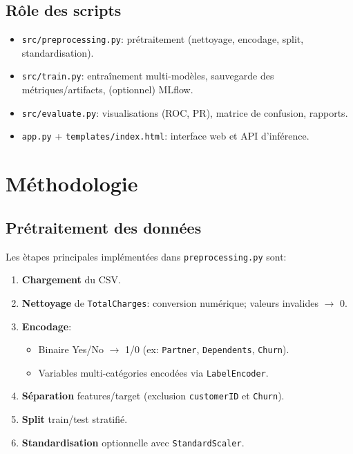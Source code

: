 \documentclass[11pt,a4paper]{article}
\begin{document}
\subsection{R\^ole des scripts}
\begin{itemize}
  \item \texttt{src/preprocessing.py}: pr\'etraitement (nettoyage, encodage, split, standardisation).
  \item \texttt{src/train.py}: entra\^inement multi-mod\`eles, sauvegarde des m\'etriques/artifacts, (optionnel) MLflow.
  \item \texttt{src/evaluate.py}: visualisations (ROC, PR), matrice de confusion, rapports.
  \item \texttt{app.py} + \texttt{templates/index.html}: interface web et API d'inf\'erence.
\end{itemize}

\section{M\'ethodologie}
\subsection{Pr\'etraitement des donn\'ees}
Les \`etapes principales impl\'ement\'ees dans \texttt{preprocessing.py} sont:
\begin{enumerate}
  \item \textbf{Chargement} du CSV.
  \item \textbf{Nettoyage} de \texttt{TotalCharges}: conversion num\'erique; valeurs invalides $\rightarrow$ 0.
  \item \textbf{Encodage}:
  \begin{itemize}
    \item Binaire Yes/No $\rightarrow$ 1/0 (ex: \texttt{Partner}, \texttt{Dependents}, \texttt{Churn}).
    \item Variables multi-cat\'egories encod\'ees via \texttt{LabelEncoder}.
  \end{itemize}
  \item \textbf{S\'eparation} features/target (exclusion \texttt{customerID} et \texttt{Churn}).
  \item \textbf{Split} train/test stratifi\'e.
  \item \textbf{Standardisation} optionnelle avec \texttt{StandardScaler}.
\end{enumerate}
\end{document}
